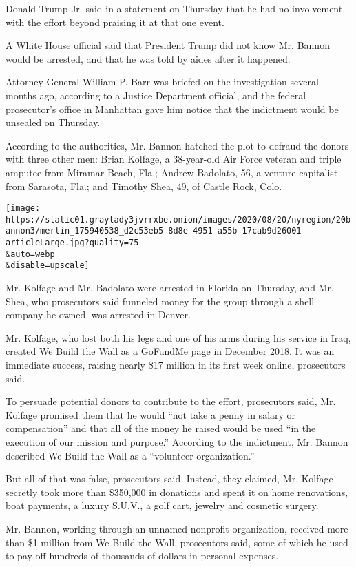 Donald Trump Jr. said in a statement on Thursday that he had no
involvement with the effort beyond praising it at that one event.

A White House official said that President Trump did not know Mr. Bannon
would be arrested, and that he was told by aides after it happened.

Attorney General William P. Barr was briefed on the investigation
several months ago, according to a Justice Department official, and the
federal prosecutor's office in Manhattan gave him notice that the
indictment would be unsealed on Thursday.

According to the authorities, Mr. Bannon hatched the plot to defraud the
donors with three other men: Brian Kolfage, a 38-year-old Air Force
veteran and triple amputee from Miramar Beach, Fla.; Andrew Badolato,
56, a venture capitalist from Sarasota, Fla.; and Timothy Shea, 49, of
Castle Rock, Colo.

\texttt{[image: https://static01.graylady3jvrrxbe.onion/images/2020/08/20/nyregion/20bannon3/merlin\_175940538\_d2c53eb5-8d8e-4951-a55b-17cab9d26001-articleLarge.jpg?quality=75\\\&auto=webp\\\&disable=upscale]}

Mr. Kolfage and Mr. Badolato were arrested in Florida on Thursday, and
Mr. Shea, who prosecutors said funneled money for the group through a
shell company he owned, was arrested in Denver.

Mr. Kolfage, who lost both his legs and one of his arms during his
service in Iraq, created We Build the Wall as a GoFundMe page in
December 2018. It was an immediate success, raising nearly \$17 million
in its first week online, prosecutors said.

To persuade potential donors to contribute to the effort, prosecutors
said, Mr. Kolfage promised them that he would ``not take a penny in
salary or compensation'' and that all of the money he raised would be
used ``in the execution of our mission and purpose.'' According to the
indictment, Mr. Bannon described We Build the Wall as a ``volunteer
organization.''

But all of that was false, prosecutors said. Instead, they claimed, Mr.
Kolfage secretly took more than \$350,000 in donations and spent it on
home renovations, boat payments, a luxury S.U.V., a golf cart, jewelry
and cosmetic surgery.

Mr. Bannon, working through an unnamed nonprofit organization, received
more than \$1 million from We Build the Wall, prosecutors said, some of
which he used to pay off hundreds of thousands of dollars in personal
expenses.

